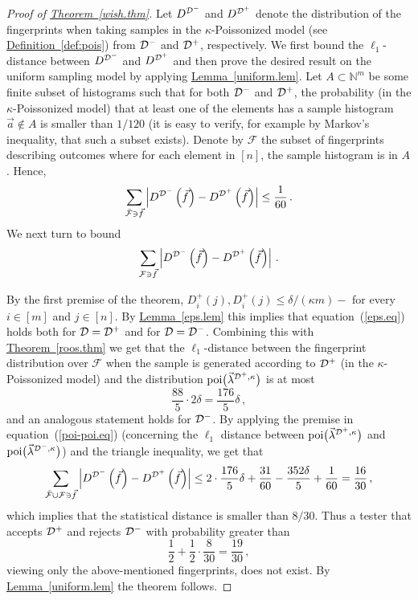 \documentclass[10pt]{article}
\theoremstyle{definition}
\numberwithin{equation}{section}
\newcommand{\expref}[2]{\texorpdfstring{\hyperref[#2]{#1~\ref{#2}}}{#1~\ref{#2}}}
\newcommand{\domain}{[n]}
\newcommand{\poi}{{\rm poi}}
\newcommand{\calD}{{\cal D}}
\newcommand{\w}{\kappa}
\begin{document}
{\begin{proof}[Proof of \expref{Theorem}{wish.thm}]
%
%
Let $D^{\calD^-}$ and $D^{\calD^+}$ denote the distribution of the fingerprints when taking samples in the $\w$-Poissonized model (see \expref{Definition}{def:pois}) from $\calD^-$ and $\calD^+$, respectively.
We first bound the $\ell_1$-distance between $D^{\calD^-}$ and $D^{\calD^+}$ and then prove the desired result on the uniform sampling model by applying \expref{Lemma}{uniform.lem}.
Let $A\subset \mathbb{N}^m$ be some finite subset of histograms such that for both $\calD^-$ and $\calD^+$, the probability (in the $\w$-Poissonized model) that at least one of the elements has a sample histogram $\vec{a}\notin A$ is smaller than ${1}/{120}$ (it is easy to verify, for example by Markov's inequality, that such a subset exists).
Denote by $\mathcal{F}$ the subset of fingerprints describing outcomes where for each element in $\domain$,  the sample histogram is in $A$.
Hence,
\[
\sum_{\bar{\mathcal{F}} \owns \vec{f}}\left|
  D^{\calD^-}\left(\vec{f}\right) - D^{\calD^+}\left(\vec{f}\right)
\right| \leq \frac{1}{60}\,.
\]
We next turn to bound 
\[
\sum_{\mathcal{F} \owns \vec{f}}\left| D^{\calD^-}\left(\vec{f}\right)
  - D^{\calD^+}\left(\vec{f}\right) \right|\,.
\]

By the first premise of the theorem, $D^+_i(j),D^+_i(j) \leq  {\delta}/{(\w m)-}$
for every $i\in[m]$ and $j \in [n]$.
By \expref{Lemma}{eps.lem} this implies that
equation~(\ref{eps.eq}) holds both for $\calD = \calD^+$ and for
$\calD = \calD^-$.
Combining this with \expref{Theorem}{roos.thm}
we get that the $\ell_1$-distance between the
fingerprint distribution over $\mathcal{F}$ when the sample
is generated according to $\calD^+$ (in the $\w$-Poissonized model) and the
distribution $\poi\bigl(\vec{\lambda}^{\calD^+,\w}\bigr)$
is at most
\[
\frac{88}{5}\cdot 2\delta = \frac{176}{5}\delta\,,
\]
and an analogous statement holds for $\calD^-$.
By applying the premise in equation~(\ref{poi-poi.eq})
(concerning the $\ell_1$ distance between $\poi\bigl(\vec{\lambda}^{\calD^+,\w}\bigr)$
and $\poi\bigl(\vec{\lambda}^{\calD^-,\w}\bigr)$)
and the triangle inequality, we get that
%
%
%
%
%
%
%
%
\[
\sum_{\bar{\mathcal{F}}\cup \mathcal{F} \owns \vec{f}}\left|
  D^{\calD^-}\left(\vec{f}\right) - D^{\calD^+}\left(\vec{f}\right)
\right| \leq 2 \cdot \frac{176}{5}\delta + \frac{31}{60} -
\frac{352\delta}{5} + \frac{1}{60}= \frac{16}{30}\,,
\]
which implies that the statistical distance is smaller than ${8}/{30}$.
Thus a tester that accepts $\calD^+$ and rejects $\calD^-$ with
probability greater than
\[
\frac{1}{2} + \frac{1}{2} \cdot \frac{8}{30}= \frac{19}{30}\,,
\]
viewing only the above-mentioned fingerprints, does not exist.
By \expref{Lemma}{uniform.lem} the theorem follows.
\end{proof}
%
%
%
}
%
\end{document}
